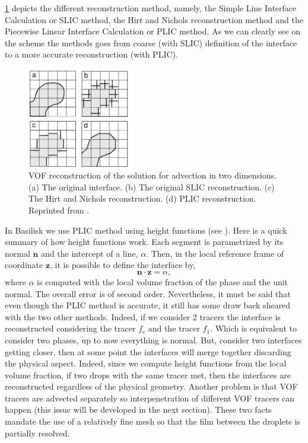 \ref{fig:VOF} depicts the different reconstruction method, namely, the Simple Line Interface Calculation or SLIC method, the Hirt and Nichols reconstruction method and the Piecewise Linear Interface Calculation or PLIC method. 
As we can clearly see on the scheme the methods goes from coarse (with SLIC) definition of the interface to a more accurate reconstruction (with PLIC).
\begin{figure}
    \centering
    \includegraphics[width = 0.4\textwidth]{image/pic/VOF.png}
    \caption{VOF reconstruction of the solution for advection in two dimensions. 
    (a) The original interface. 
    (b) The original SLIC reconstruction. 
    (c) The Hirt and Nichols reconstruction. 
    (d) PLIC reconstruction. 
    Reprinted from \citet{tryggvason2011direct}.}
    \label{fig:VOF}
\end{figure}
In Basilisk we use PLIC method using height functions (see \citet[Chapter 5]{tryggvason2011direct}). 
Here is a quick summary of how height functions work.
Each segment is parametrized by its normal $\textbf{n}$ and the intercept of a line, $\alpha$. 
Then, in the local reference frame of coordinate $\textbf{z}$, it is possible to define the interface by,
\begin{equation}
    \textbf{n}\cdot\textbf{z} 
    = \alpha,
\end{equation}
where $\alpha$ is computed with the local volume fraction of the phase and the unit normal. 
The overall error is of second order. 
Nevertheless, it must be said that even though the PLIC method is accurate, it still has some draw back sheared with the two other methods. 
Indeed, if we consider 2 tracers the interface is reconstructed considering the tracer $f_c$ and the tracer $f_1$.
Which is equivalent to consider two phases, up to now everything is normal. 
But, consider two interfaces getting closer, then at some point the interfaces will merge together discarding the physical aspect.
Indeed, since we compute height functions from the local volume fraction, if two drops with the same tracer met, then the interfaces are reconstructed regardless of the physical geometry. 
Another problem is that VOF tracers are advected separately so interpenetration of different VOF tracers can happen (this issue will be developed in the next section). 
These two facts mandate the use of a relatively fine mesh so that the film between the droplets is partially resolved.

